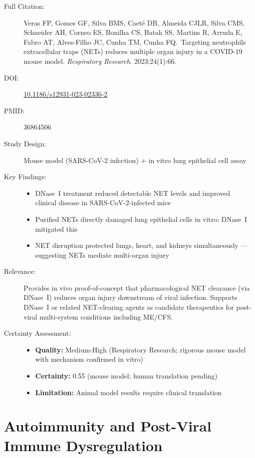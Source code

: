 \begin{description}
    \item[Full Citation:] Veras FP, Gomes GF, Silva BMS, Caeté DB, Almeida CJLR, Silva CMS, Schneider AH, Corneo ES, Bonilha CS, Batah SS, Martins R, Arruda E, Fabro AT, Alves-Filho JC, Cunha TM, Cunha FQ.\ Targeting neutrophils extracellular traps (NETs) reduces multiple organ injury in a COVID-19 mouse model. \textit{Respiratory Research}. 2023;24(1):66. \cite{Veras2023}
    \item[DOI:] \href{https://doi.org/10.1186/s12931-023-02336-2}{10.1186/s12931-023-02336-2}
    \item[PMID:] 36864506
    \item[Study Design:] Mouse model (SARS-CoV-2 infection) $+$ in vitro lung epithelial cell assay
    \item[Key Findings:]
    \begin{itemize}
        \item DNase~I treatment reduced detectable NET levels and improved clinical disease in SARS-CoV-2-infected mice
        \item Purified NETs directly damaged lung epithelial cells in vitro; DNase~I mitigated this
        \item NET disruption protected lungs, heart, and kidneys simultaneously --- suggesting NETs mediate multi-organ injury
    \end{itemize}
    \item[Relevance:] Provides in vivo proof-of-concept that pharmacological NET clearance (via DNase~I) reduces organ injury downstream of viral infection. Supports DNase~I or related NET-clearing agents as candidate therapeutics for post-viral multi-system conditions including ME/CFS.
    \item[Certainty Assessment:]
    \begin{itemize}
        \item \textbf{Quality:} Medium-High (Respiratory Research; rigorous mouse model with mechanism confirmed in vitro)
        \item \textbf{Certainty:} 0.55 (mouse model; human translation pending)
        \item \textbf{Limitation:} Animal model results require clinical translation
    \end{itemize}
\end{description}

\section{Autoimmunity and Post-Viral Immune Dysregulation}
\label{sec:bib-autoimmunity-2026}

